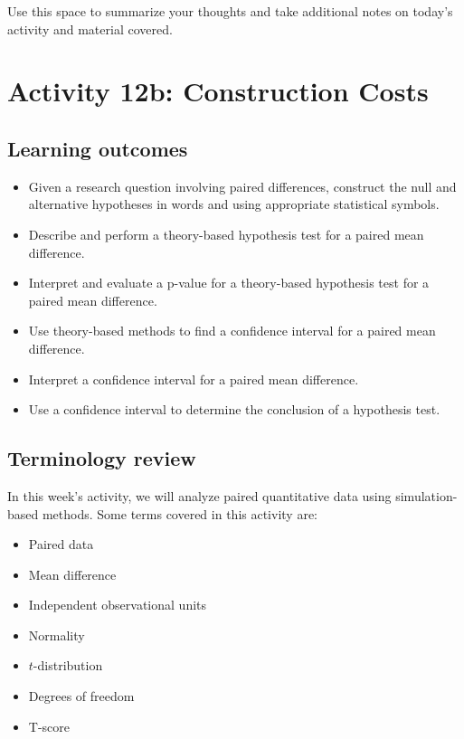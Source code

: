 \documentclass[
]{report}
\begin{document}
Use this space to summarize your thoughts and take additional notes on today's activity and material covered.

\newpage

\hypertarget{activity-12b-construction-costs}{%
\section{Activity 12b: Construction Costs}\label{activity-12b-construction-costs}}


\hypertarget{learning-outcomes-7}{%
\subsection{Learning outcomes}\label{learning-outcomes-7}}

\begin{itemize}
\item
  Given a research question involving paired differences, construct the null and alternative hypotheses
  in words and using appropriate statistical symbols.
\item
  Describe and perform a theory-based hypothesis test for a paired mean difference.
\item
  Interpret and evaluate a p-value for a theory-based hypothesis test for a paired mean difference.
\item
  Use theory-based methods to find a confidence interval for a paired mean difference.
\item
  Interpret a confidence interval for a paired mean difference.
\item
  Use a confidence interval to determine the conclusion of a hypothesis test.
\end{itemize}

\hypertarget{terminology-review-20}{%
\subsection{Terminology review}\label{terminology-review-20}}

In this week's activity, we will analyze paired quantitative data using simulation-based methods. Some terms covered in this activity are:

\begin{itemize}
\item
  Paired data
\item
  Mean difference
\item
  Independent observational units
\item
  Normality
\item
  \(t\)-distribution
\item
  Degrees of freedom
\item
  T-score
\end{itemize}
\end{document}
